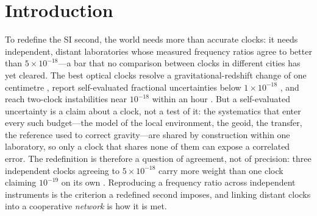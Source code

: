 \documentclass[11pt,a4paper]{article}
\begin{document}
\begin{abstract}
\end{abstract}


\section{Introduction}
To redefine the SI second, the world needs more than accurate clocks: it
needs independent, distant laboratories whose measured frequency ratios
agree to better than $5\times10^{-18}$---a bar that no comparison between
clocks in different cities has yet cleared. The best optical clocks
resolve a gravitational-redshift change of one centimetre
\citep{mcgrew2018geodesy}, report self-evaluated fractional uncertainties
below $1\times10^{-18}$ \citep{arnold2026lu, zhang2026ca}, and reach
two-clock instabilities near $10^{-18}$ within an hour
\citep{oelker2019stability}. But a self-evaluated uncertainty is a claim
about a clock, not a test of it: the systematics that enter every such
budget---the model of the local environment, the geoid, the transfer,
the reference used to correct gravity---are shared by construction within
one laboratory, so only a clock that shares none of them can expose a
correlated error. The redefinition is therefore a question of agreement,
not of precision: three independent clocks agreeing to $5\times10^{-18}$
carry more weight than one clock claiming $10^{-19}$ on its own
\citep{dimarcq2024roadmap}. Reproducing a frequency ratio across
independent instruments is the criterion a redefined second imposes, and
linking distant clocks into a cooperative \emph{network}
\citep{riehle2017networks, komar2014quantumnetwork} is how it is met.
\end{document}
